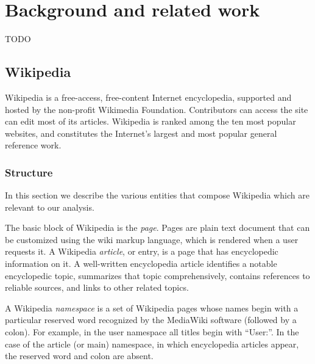 
\chapter{Background and related work}
\label{cha:background}
TODO


\section{Wikipedia}
\label{sec:wiki}
Wikipedia is a free-access, free-content Internet encyclopedia, supported and hosted by the non-profit Wikimedia Foundation.
Contributors can access the site can edit most of its articles.
Wikipedia is ranked among the ten most popular websites, and constitutes the Internet's largest and most popular general reference work.

\subsection{Structure}
\label{ssec:wiki_structure}
In this section we describe the various entities that compose Wikipedia which are relevant to our analysis.

The basic block of Wikipedia is the \emph{page}.
Pages are plain text document that can be customized using the wiki markup language, which is rendered when a user requests it.
A Wikipedia \emph{article}, or entry, is a page that has encyclopedic information on it.
A well-written encyclopedia article identifies a notable encyclopedic topic, summarizes that topic comprehensively, contains references to reliable sources, and links to other related topics.

A Wikipedia \emph{namespace} is a set of Wikipedia pages whose names begin with a particular reserved word recognized by the MediaWiki software (followed by a colon).
For example, in the user namespace all titles begin with ``User:''.
In the case of the article (or main) namespace, in which encyclopedia articles appear, the reserved word and colon are absent.

